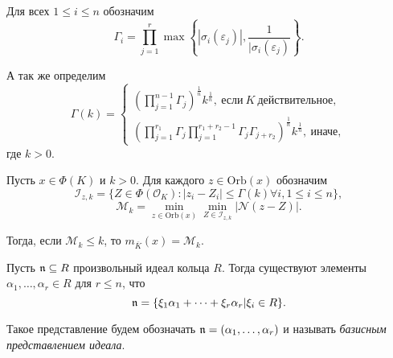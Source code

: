 \documentclass[_00_dissertation.tex]{subfiles}
\begin{document}
\begin{definition}
    Для всех $1 \le i \le n$ обозначим
    \begin{equation*}
        \Gamma_i = \prod\limits_{j=1}^r \max\left\{
            |\sigma_i(\varepsilon_j)|, \frac{1}{|\sigma_i(\varepsilon_j)}
        \right\}.
    \end{equation*}

    А так же определим
    \begin{equation*}
        \Gamma(k) =
        \begin{cases}
            \left(
                \prod\limits_{j=1}^{n-1} \Gamma_j
            \right)^{\frac{1}{n}} k^{\frac{1}{n}},\ \textrm{если}\ K\ \textrm{действительное},\\
            \left(
                \prod\limits_{j=1}^{r_1} \Gamma_j \prod\limits_{j=1}^{r_1+r_2-1} \Gamma_j \Gamma_{j+r_2}
            \right)^{\frac{1}{n}} k^{\frac{1}{n}},\ \textrm{иначе},
        \end{cases}
    \end{equation*}
    где $k>0$.
\end{definition}

\begin{statement}\label{proposition:division_with_least_norm_remainder} \cite[с.~1403]{source:Lezowski} 
    Пусть $x \in \Phi(K)$ и $k > 0$.
    Для каждого $z \in \textrm{Orb}(x)$ обозначим
    \begin{equation*}
        \mathcal{I}_{z, k} = \{Z \in \Phi(\mathcal{O}_K): |z_i-Z_i| \le \Gamma(k) \forall i, 1 \le i \le n\},
    \end{equation*}
    \begin{equation*}
        \mathcal{M}_k = \min\limits_{z \in \textrm{Orb}(x)} \min\limits_{Z \in \mathcal{I}_{z, k}} |\mathcal{N}(z-Z)|.
    \end{equation*}

    Тогда, если $\mathcal{M}_k \le k$, то $m_{\overline{K}}(x) = \mathcal{M}_k$.
\end{statement}

\begin{definition}
    Пусть $\mathfrak{n} \subseteq R$ произвольный идеал кольца $R$.
    Тогда существуют элементы $\alpha_1, \dots, \alpha_r \in R$ для $r \leq n$, что
    \begin{equation*}
        \mathfrak{n} = \{\xi_1 \alpha_1 + \dots + \xi_r \alpha_r | \xi_i \in R\}.
    \end{equation*}
    
    Такое представление будем обозначать $\mathfrak{n} = (\alpha_1, \dots, \alpha_r)$ и называть \emph{базисным представлением идеала}.
\end{definition}
\end{document}
